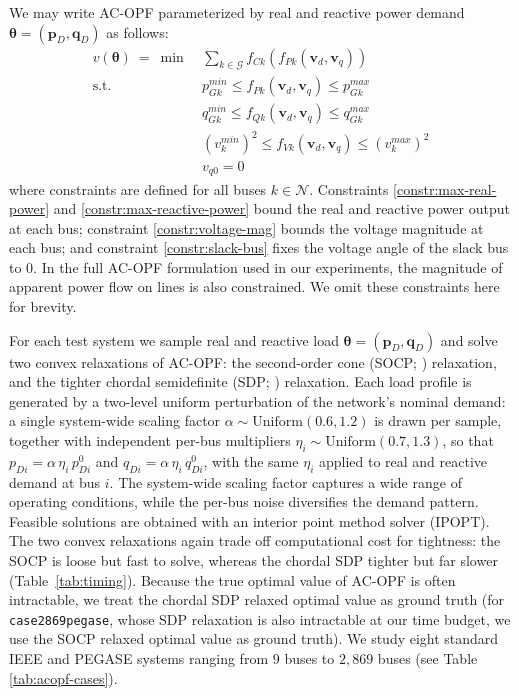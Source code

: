 \documentclass[10pt]{article} %
\theoremstyle{plain}
\theoremstyle{definition}
\theoremstyle{remark}
\begin{document}
We may write AC-OPF parameterized by real and reactive power demand $\bm{\theta} = (\mathbf{p}_D, \mathbf{q}_D)$ as follows:
\begin{align}
    v(\bm{\theta}) ~= ~ \min~& \sum_{k \in \mathcal{G}} f_{Ck}(f_{Pk}(\mathbf{v}_d, \mathbf{v}_q))  \label{eq:AC-OPF} \\
    \text{s.t.}~& p_{Gk}^{min} \leq f_{Pk}(\mathbf{v}_d, \mathbf{v}_q) \leq p_{Gk}^{max} \label{constr:max-real-power} \\
    & q_{Gk}^{min} \leq f_{Qk}(\mathbf{v}_d, \mathbf{v}_q) \leq q_{Gk}^{max} \label{constr:max-reactive-power}\\
    & (v_{k}^{min})^2 \leq f_{Vk}(\mathbf{v}_d, \mathbf{v}_q) \leq (v_{k}^{max})^2 \label{constr:voltage-mag} \\
    & v_{q0} = 0 \label{constr:slack-bus}
\end{align}
where constraints are defined for all buses $k \in \mathcal{N}$. Constraints \cref{constr:max-real-power}{}{} and \cref{constr:max-reactive-power}{}{} bound the real and reactive power output at each bus; constraint \cref{constr:voltage-mag}{}{} bounds the voltage magnitude at each bus; and constraint \cref{constr:slack-bus}{}{} fixes the voltage angle of the slack bus to $0$. In the full AC-OPF formulation used in our experiments, the magnitude of apparent power flow on lines is also constrained. We omit these constraints here for brevity.

For each test system we sample real and reactive load $\bm{\theta} = (\mathbf{p}_D, \mathbf{q}_D)$ and solve two convex relaxations of AC-OPF: the second-order cone (SOCP; \citealp{jabr2006radial}) relaxation, and the tighter chordal semidefinite (SDP; \citealp{lavaei2012zero}) relaxation.
Each load profile is generated by a two-level uniform perturbation of the network's nominal demand: a single system-wide scaling factor $\alpha \sim \mathrm{Uniform}(0.6, 1.2)$ is drawn per sample, together with independent per-bus multipliers $\eta_i \sim \mathrm{Uniform}(0.7, 1.3)$, so that $p_{Di} = \alpha\,\eta_i\,p_{Di}^{0}$ and $q_{Di} = \alpha\,\eta_i\,q_{Di}^{0}$, with the same $\eta_i$ applied to real and reactive demand at bus $i$. 
The system-wide scaling factor captures a wide range of operating conditions, while the per-bus noise diversifies the demand pattern.
Feasible solutions are obtained with an interior point method solver (IPOPT).
The two convex relaxations again trade off computational cost for tightness: the SOCP is loose but fast to solve, whereas the chordal SDP tighter but far slower (Table~\ref{tab:timing}).
Because the true optimal value of AC-OPF is often intractable, we treat the chordal SDP relaxed optimal value as ground truth (for \texttt{case2869pegase}, whose SDP relaxation is also intractable at our time budget, we use the SOCP relaxed optimal value as ground truth). We study eight standard IEEE and PEGASE systems ranging from $9$ buses to $2{,}869$ buses (see Table \ref{tab:acopf-cases}).
\end{document}
